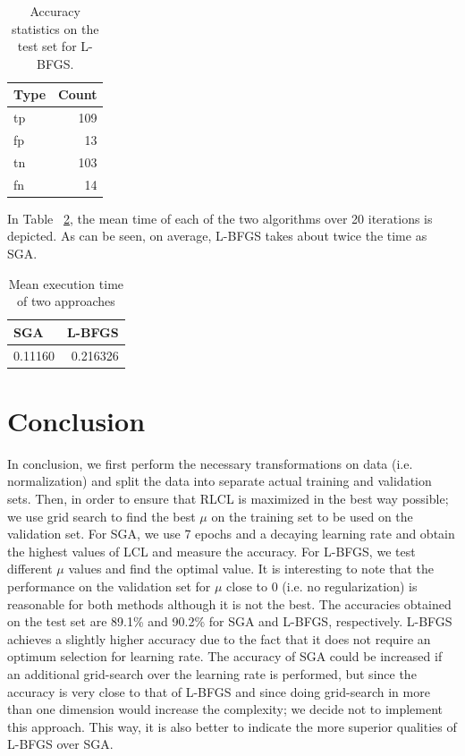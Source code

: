 \documentclass[a4paper]{article}
\begin{document}
\begin{table}
\centering
\begin{tabular}{l|r}
Type & Count \\\hline
tp & 109 \\
fp & 13 \\
tn & 103 \\
fn & 14
\end{tabular}
\caption{\label{tab:lbfgstable}Accuracy statistics on the test set for L-BFGS.}
\end{table}

In Table  ~\ref{tab:timet}, the mean time of each of the two algorithms over 20 iterations is depicted. As can be seen, on average, L-BFGS takes about twice the time as SGA. 

\begin{table}
\centering
\begin{tabular}{l|r}
SGA & L-BFGS \\\hline
0.11160 & 0.216326
\end{tabular}
\caption{\label{tab:timet}Mean execution time of two approaches}
\end{table}

\section{Conclusion}

In conclusion, we first perform the necessary transformations on data (i.e. normalization) and split the data into separate actual training and validation sets. Then, in order to ensure that RLCL is maximized in the best way possible; we use grid search to find the best $\mu$ on the training set to be used on the validation set. For SGA, we use 7 epochs and a decaying learning rate and obtain the highest values of LCL and measure the accuracy. For L-BFGS, we test different $\mu$ values and find the optimal value. It is interesting to note that the performance on the validation set for $\mu$ close to 0 (i.e. no regularization) is reasonable for both methods although it is not the best. The accuracies obtained on the test set are 89.1\% and 90.2\% for SGA and L-BFGS, respectively. L-BFGS achieves a slightly higher accuracy due to the fact that it does not require an optimum selection for learning rate. The accuracy of SGA could be increased if an additional grid-search over the learning rate is performed, but since the accuracy is very close to that of L-BFGS and since doing grid-search in more than one dimension would increase the complexity; we decide not to implement this approach. This way, it is also better to indicate the more superior qualities of L-BFGS over SGA.\\
\end{document}
